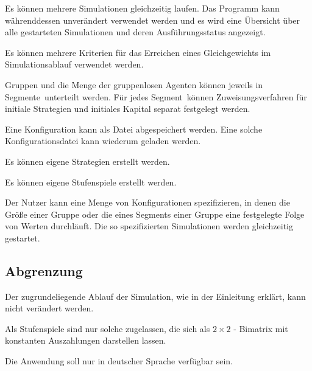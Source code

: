 \documentclass[parskip=full,11pt]{scrartcl}
\def\segment{Segment}
\def\segments{Segmente}
\begin{document}
Es können mehrere Simulationen gleichzeitig laufen. Das Programm kann währenddessen unverändert verwendet werden und es wird eine Übersicht über alle gestarteten Simulationen und deren Ausführungsstatus angezeigt.

Es können mehrere Kriterien für das Erreichen eines Gleichgewichts im Simulationsablauf verwendet werden.

Gruppen und die Menge der gruppenlosen Agenten können jeweils in \segments\ unterteilt werden. Für jedes \segment\ können Zuweisungsverfahren für initiale Strategien und initiales Kapital separat festgelegt werden.

Eine Konfiguration kann als Datei abgespeichert werden. Eine solche Konfigurationsdatei kann wiederum geladen werden.

Es können eigene Strategien erstellt werden.

Es können eigene Stufenspiele erstellt werden.

Der Nutzer kann eine Menge von Konfigurationen spezifizieren, in denen die Größe einer Gruppe oder die eines \segment s einer Gruppe eine festgelegte Folge von Werten durchläuft. Die so spezifizierten Simulationen werden gleichzeitig gestartet.

\subsection{Abgrenzung}

Der zugrundeliegende Ablauf der Simulation, wie in der Einleitung erklärt, kann nicht verändert werden.

Als Stufenspiele sind nur solche zugelassen, die sich als \(2 \times 2\) - Bimatrix mit konstanten Auszahlungen darstellen lassen.

Die Anwendung soll nur in deutscher Sprache verfügbar sein.

\pagebreak
\end{document}
